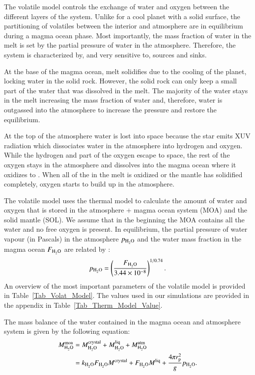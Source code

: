 \documentclass[oneside,twocolumn]{article}
\begin{document}
The volatile model controls the exchange of water and oxygen between the different layers of the system.
Unlike for a cool planet with a solid surface, the partitioning of volatiles between the interior and atmosphere are in equilibrium during a magma ocean phase. Most importantly, the mass fraction of water in the melt is set by the partial pressure of water in the atmosphere. Therefore, the system is characterized by, and very sensitive to, sources and sinks.

At the base of the magma ocean, melt solidifies due to the cooling of the planet, locking water in the solid rock. However, the solid rock can only keep a small part of the water that was dissolved in the melt. The majority of the water stays in the melt increasing the mass fraction of water and, therefore, water is outgassed into the atmosphere to increase the pressure and restore the equilibrium.

At the top of the atmosphere water is lost into space because the star emits XUV radiation which dissociates water in the atmosphere into hydrogen and oxygen.
While the hydrogen and part of the oxygen escape to space, the rest of the oxygen stays in the atmosphere and dissolves into the magma ocean where it oxidizes  to .
When all of the  in the melt is oxidized or the mantle has solidified completely, oxygen starts to build up in the atmosphere.

The volatile model uses the thermal model to calculate the amount of water and oxygen that is stored in the atmosphere + magma ocean system (MOA) and the solid mantle (SOL). We assume that in the beginning the MOA contains all the water and no free oxygen is present.
In equilibrium, the partial pressure of water vapour (in Pascals) in the atmosphere $p_{\ce{H2O}}$ and the water mass fraction in the magma ocean $F_{\ce{H2O}}$ are related by \citep{Papale1997}:
\begin{equation}
	p_{\ce{H2O}} = \left( \frac{ F_{\ce{H2O}} }{ 3.44 \times 10^{-8} } \right)^{1/0.74}.
	\label{water_equi}
\end{equation}
An overview of the most important parameters of the volatile model is provided in Table~\ref{Tab_Volat_Model}. 
The values used in our simulations are provided in the appendix in Table~\ref{Tab_Therm_Model_Value}. 

The mass balance of the water contained in the magma ocean and atmosphere system is given by the following equation:
\begin{equation}
	\begin{aligned}
		M_{\ce{H2O}}^{\mathrm{moa}} &= M_{\ce{H2O}}^{\mathrm{crystal}} + M_{\ce{H2O}}^{\mathrm{liq}} + M_{\ce{H2O}}^{\mathrm{atm}} \\
		&= k_{\ce{H2O}} F_{\ce{H2O}} M^{\mathrm{crystal}} + F_{\ce{H2O}} M^{\mathrm{liq}} + \frac{4 \pi r_\mathrm{p}^2}{g} p_{\ce{H2O}}.
	\end{aligned}
\end{equation}
\end{document}
